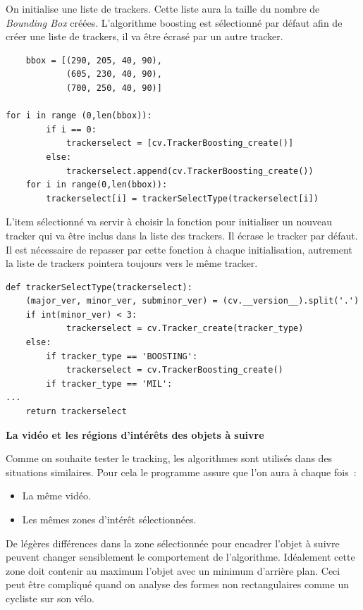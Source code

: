   On initialise une liste de trackers. Cette liste aura la taille du nombre de \textit{Bounding Box} créées. L'algorithme boosting est sélectionné par défaut afin de créer une liste de trackers, il va être écrasé par un autre tracker.
\begin{verbatim}
    bbox = [(290, 205, 40, 90),
            (605, 230, 40, 90),
            (700, 250, 40, 90)]
            
for i in range (0,len(bbox)):
        if i == 0:
            trackerselect = [cv.TrackerBoosting_create()]
        else:
            trackerselect.append(cv.TrackerBoosting_create())
    for i in range(0,len(bbox)):
        trackerselect[i] = trackerSelectType(trackerselect[i])
\end{verbatim}


  L'item sélectionné va servir à choisir la fonction pour initialiser un nouveau tracker qui va être inclus dans la liste des trackers. Il écrase le tracker par défaut. Il est nécessaire de repasser par cette fonction à chaque initialisation, autrement la liste de trackers pointera toujours vers le même tracker.

\begin{verbatim}
def trackerSelectType(trackerselect):
    (major_ver, minor_ver, subminor_ver) = (cv.__version__).split('.')
    if int(minor_ver) < 3:
            trackerselect = cv.Tracker_create(tracker_type)
    else:
        if tracker_type == 'BOOSTING':
            trackerselect = cv.TrackerBoosting_create()
        if tracker_type == 'MIL':
...
    return trackerselect
\end{verbatim}


\textbf{La vidéo et les régions d'intérêts des objets à suivre}

Comme on souhaite tester le tracking, les algorithmes sont utilisés dans des situations similaires. Pour cela le programme assure que l'on aura à chaque fois~:
\begin{itemize}[noitemsep]
\item La même vidéo.
\item Les mêmes zones d’intérêt sélectionnées. 
\end{itemize}
De légères différences dans la zone sélectionnée pour encadrer l'objet à suivre peuvent changer sensiblement le comportement de l'algorithme. Idéalement cette zone doit contenir au maximum l'objet avec un minimum d'arrière plan. Ceci peut être compliqué quand on analyse des formes non rectangulaires comme un cycliste sur son vélo.

